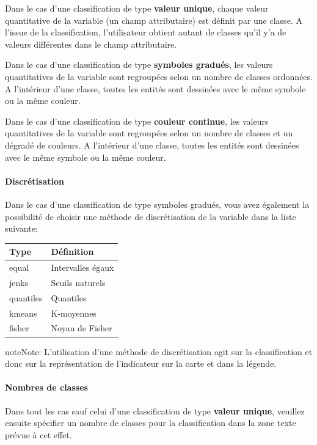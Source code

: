 \documentclass[letterpaper,10pt,french]{sphinxmanual}
\begin{document}
Dans le cas d'une classification de type \textbf{valeur unique}, chaque valeur quantitative de la variable (un champ attributaire) est définit par une classe. A l'issue de la classification, l'utilisateur obtient autant de classes qu'il y'a de valeurs différentes dans le champ attributaire.

Dans le cas d'une classification de type \textbf{symboles gradués}, les valeurs quantitatives de la variable sont regroupées selon un nombre de classes ordonnées. A l'intérieur d'une classe, toutes les entités sont dessinées avec le même symbole ou la même couleur.

Dans le cas d'une classification de type \textbf{couleur continue}, les valeurs quantitatives de la variable sont regroupées selon un nombre de classes et un dégradé de couleurs. A l'intérieur d'une classe, toutes les entités sont dessinées avec le même symbole ou la même couleur.
\paragraph{Discrétisation}

Dans le cas d'une classification de type symboles gradués, vous avez également la possibilité de choisir une méthode de discrétisation de la variable dans la liste suivante:

\begin{tabulary}{\linewidth}{|L|L|}
\hline

\textbf{Type}
 & 
\textbf{Définition}
\\
\hline
equal
 & 
Intervalles égaux
\\
\hline
jenks
 & 
Seuils naturels
\\
\hline
quantiles
 & 
Quantiles
\\
\hline
kmeans
 & 
K-moyennes
\\
\hline
fisher
 & 
Noyau de Fisher
\\
\hline\end{tabulary}


\begin{notice}{note}{Note:}
L'utilisation d'une méthode de discrétisation agit sur la classification et donc sur la représentation de l'indicateur sur la carte et dans la légende.
\end{notice}
\paragraph{Nombres de classes}

Dans tout les cas sauf celui d'une classification de type \textbf{valeur unique}, veuillez ensuite spécifier un nombre de classes pour la classification dans la zone texte prévue à cet effet.
\end{document}
